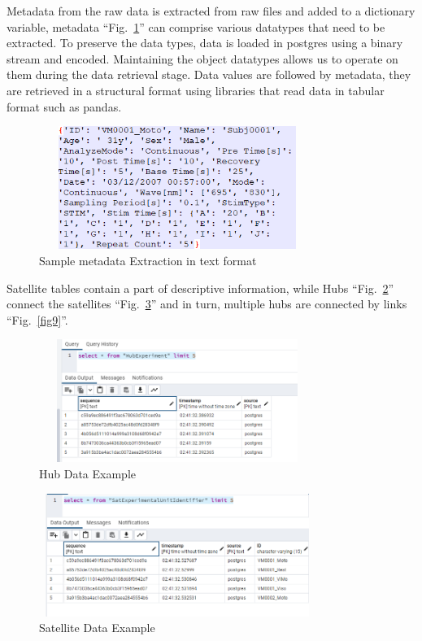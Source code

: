 \documentclass[conference]{IEEEtran}
\begin{document}
Metadata from the raw data is extracted from raw files and added to a dictionary variable, metadata ``Fig.~\ref{fig6}'' can comprise various datatypes that need to be extracted. To preserve the data types, data is loaded in postgres using a binary stream and encoded. Maintaining the object datatypes allows us to operate on them during the data retrieval stage. Data values are followed by metadata, they are retrieved in a structural format using libraries that read data in tabular format such as pandas.

\begin{figure}[htbp]
\centerline{\includegraphics[width=9cm, height=4cm]{Figure6.png}}
\caption{Sample metadata Extraction in text format}
\label{fig6}
\end{figure}


Satellite tables contain a part of descriptive information, while Hubs ``Fig.~\ref{fig7}'' connect the satellites ``Fig.~\ref{fig8}'' and in turn, multiple hubs are connected by links ``Fig.~\ref{fig9}''.

\begin{figure}[htbp]
\centerline{\includegraphics[width=9cm, height=4cm]{Figure7.png}}
\caption{Hub Data Example}
\label{fig7}
\end{figure}

\begin{figure}[htbp]
\centerline{\includegraphics[width=9cm, height=4cm]{Figure8.png}}
\caption{Satellite Data Example}
\label{fig8}
\end{figure}
\end{document}
